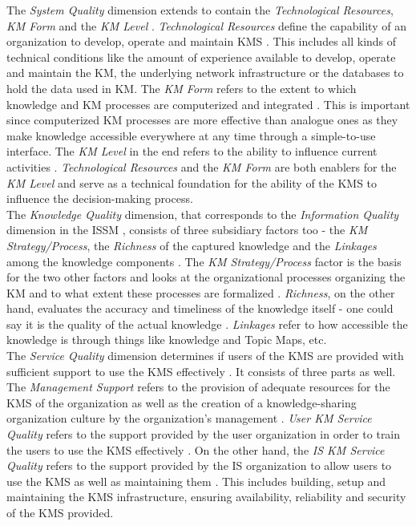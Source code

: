 \documentclass[
	english,
	ruledheaders=section,%
	class=report,%
	thesis={type=bachelor},%
	accentcolor=1b,%
	custommargins=true,%
	marginpar=false,%
	parskip=half-,%
	fontsize=11pt,%
	DIV=14,
]{tudapub}
\begin{document}
The \textit{System Quality} dimension extends to contain the \textit{Technological Resources}, \textit{KM Form} and the \textit{KM Level} \parencite[p.~56]{Jennex2006}. \textit{Technological Resources} define the capability of an organization to develop, operate and maintain KMS \parencite[p.~56]{Jennex2006}. This includes all kinds of technical conditions like the amount of experience available to develop, operate and maintain the KM, the underlying network infrastructure or the databases to hold the data used in KM. The \textit{KM Form} refers to the extent to which knowledge and KM processes are computerized and integrated \parencite[p.~56]{Jennex2006}. This is important since computerized KM processes are more effective than analogue ones as they make knowledge accessible everywhere at any time through a simple-to-use interface. The \textit{KM Level} in the end refers to the ability to influence current activities \parencite[p.~57]{Jennex2006}. \textit{Technological Resources} and the \textit{KM Form} are both enablers for the \textit{KM Level} and serve as a technical foundation for the ability of the KMS to influence the decision-making process.\\
The \textit{Knowledge Quality} dimension, that corresponds to the \textit{Information Quality} dimension in the ISSM \parencite[~p.~64]{DeloneMcLean2003ISSuccessTenYearUpdate}, consists of three subsidiary factors too - the \textit{KM Strategy/Process}, the \textit{Richness} of the captured knowledge and the \textit{Linkages} among the knowledge components \parencite[p.~57]{Jennex2006}. The \textit{KM Strategy/Process} factor is the basis for the two other factors and looks at the organizational processes organizing the KM and to what extent these processes are formalized \parencite[p.~57]{Jennex2006}. \textit{Richness}, on the other hand, evaluates the accuracy and timeliness of the knowledge itself - one could say it is the quality of the actual knowledge \parencite[p.~57]{Jennex2006}. \textit{Linkages} refer to how accessible the knowledge is through things like knowledge and Topic Maps, etc. \parencite[p.~57]{Jennex2006}\\
The \textit{Service Quality} dimension determines if users of the KMS are provided with sufficient support to use the KMS effectively \parencite[p.~58]{Jennex2006}. It consists of three parts as well. The \textit{Management Support} refers to the provision of adequate resources for the KMS of the organization as well as the creation of a knowledge-sharing organization culture by the organization's management \parencite[p.~58]{Jennex2006}. \textit{User KM Service Quality} refers to the support provided by the user organization in order to train the users to use the KMS effectively \parencite[p.~58]{Jennex2006}. On the other hand, the \textit{IS KM Service Quality} refers to the support provided by the IS organization to allow users to use the KMS as well as maintaining them \parencite[p.~59]{Jennex2006}. This includes building, setup and maintaining the KMS infrastructure, ensuring availability, reliability and security of the KMS provided.\\\\
\end{document}
